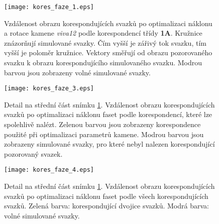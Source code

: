  
 \begin{figure}[htbp]
    \centering\texttt{[image: kores\_faze\_1.eps]}
    \caption[Vzdálenost obrazu korespondujících svazků - fáze 0.]{Vzdálenost obrazu korespondujících svazků po optimalizaci náklonu a rotace kamene \textit{viva12} podle korespondencí třídy \textbf{1A}. Kružnice znázorňují simulované svazky. Čím vyšší je zářivý tok svazku, tím vyšší je poloměr kružnice. Vektory směřují od obrazu pozorovaného svazku k obrazu korespondujícího simulovaného svazku. Modrou barvou jsou zobrazeny volné simulované svazky.}
 \label{fig: kores_faze_0}
 \end{figure}

 
 \begin{figure}[htbp]
    \centering\texttt{[image: kores\_faze\_3.eps]}
    \caption[Vzdálenost obrazu korespondujících svazků - fáze 1.]{Detail na střední část snímku \ref{fig: kores_faze_0}. Vzdálenost obrazu korespondujících svazků po optimalizaci náklonu faset podle korespondencí, které lze spolehlivě nalézt. Zelenou barvou jsou zobrazeny korespondence použité při optimalizaci parametrů kamene. Modrou barvou jsou zobrazeny simulované svazky, pro které nebyl nalezen korespondující pozorovaný svazek.}
 \label{fig: kores_faze_1}
 \end{figure}
 
  \begin{figure}[htbp]
    \centering\texttt{[image: kores\_faze\_4.eps]}
    \caption[Vzdálenost obrazu korespondujících svazků - konečná fáze.]{Detail na střední část snímku \ref{fig: kores_faze_0}. Vzdálenost obrazu korespondujících svazků po optimalizaci náklonu faset podle všech korespondujících svazků. Zelená barva: korespondující dvojice svazků. Modrá barva: volné simulované svazky.}
 \label{fig: kores_faze_2}
 \end{figure}
 
 \clearpage